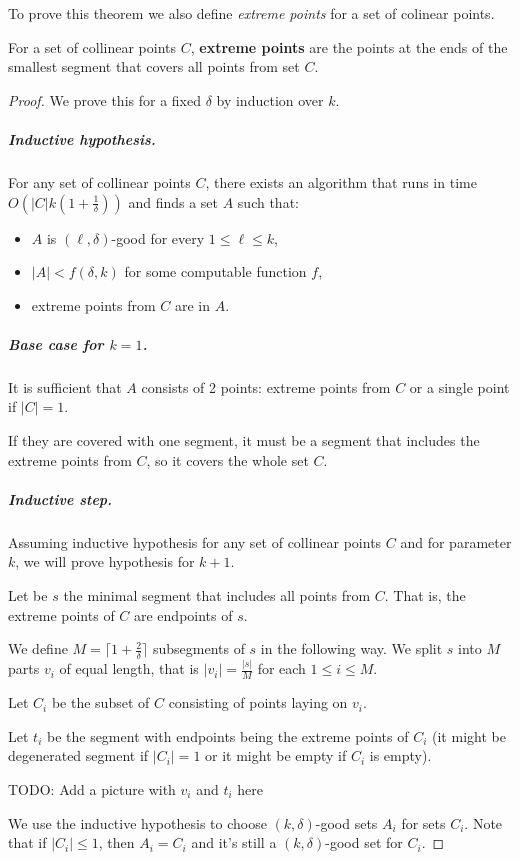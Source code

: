 To prove this theorem we also define \textit{extreme points}
for a set of colinear points.

\begin{defi}
	For a set of collinear points $C$,
	\textbf{extreme points} are the points at the ends
	of the smallest segment that covers all points from set $C$.
\end{defi}

\begin{proof}
We prove this for a fixed $\delta$ by induction over $k$.

\subparagraph{Inductive hypothesis.}
For any set of collinear points $C$,
there exists an algorithm that 
runs in time $O(|C|k(1+\frac{1}{\delta}))$
and finds a set $A$ such that:
\begin{itemize}
\item $A$ is $(\ell, \delta)$-good for every $1 \le \ell \le k$,
\item $|A| < f(\delta, k)$ for some computable function $f$,
\item extreme points from $C$ are in $A$.
\end{itemize}

\subparagraph{Base case for $k = 1$.}
It is sufficient that $A$ consists of 2 points: extreme points from $C$
or a single point if $|C| = 1$.

If they are covered with one segment, it must be a segment 
that includes the extreme points from $C$, so it covers the whole set $C$.

\subparagraph{Inductive step.}
Assuming inductive hypothesis for any set of collinear points $C$
and for parameter $k$, we will prove hypothesis for $k+1$.

Let be $s$ the minimal segment that includes all points from $C$.
That is, the extreme points of $C$ are endpoints of $s$.

We define $M = \lceil1+\frac{2}{\delta}\rceil$ subsegments of $s$ in the following way.
We split $s$ into $M$ parts 
$v_i$ of equal length, that is $|v_i| = \frac{|s|}{M}$ for each $1 \le i \le M$.

Let $C_i$ be the subset of $C$ consisting of points laying on $v_i$.

Let $t_i$ be the segment with endpoints being the extreme points of $C_i$
(it might be degenerated segment if $|C_i| = 1$ or it might be empty
if $C_i$ is empty).

TODO: Add a picture with $v_i$ and $t_i$ here

We use the inductive hypothesis to choose $(k, \delta)$-good sets $A_i$
for sets $C_i$. Note that if $|C_i| \le 1$, then $A_i = C_i$
and it's still a $(k, \delta)$-good set for $C_i$.


\end{proof}
